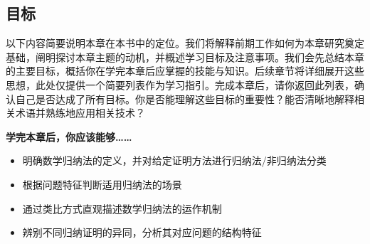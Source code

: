 \subsection{目标}

以下内容简要说明本章在本书中的定位。我们将解释前期工作如何为本章研究奠定基础，阐明探讨本章主题的动机，并概述学习目标及注意事项。我们会先总结本章的主要目标，概括你在学完本章后应掌握的技能与知识。后续章节将详细展开这些思想，此处仅提供一个简要列表作为学习指引。完成本章后，请你返回此列表，确认自己是否达成了所有目标。你是否能理解这些目标的重要性？能否清晰地解释相关术语并熟练地应用相关技术？

\textbf{学完本章后，你应该能够……}

\begin{itemize}
    \item 明确数学归纳法的定义，并对给定证明方法进行归纳法/非归纳法分类
    \item 根据问题特征判断适用归纳法的场景
    \item 通过类比方式直观描述数学归纳法的运作机制
    \item 辨别不同归纳证明的异同，分析其对应问题的结构特征
\end{itemize}

